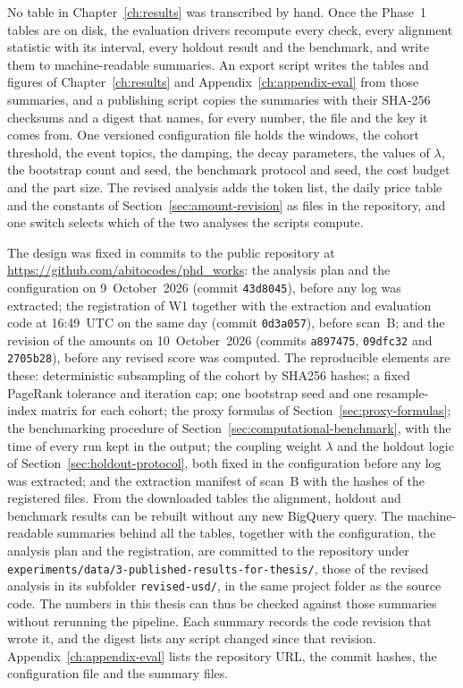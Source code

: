 
No table in Chapter~\ref{ch:results} was transcribed by hand. Once the Phase~1 tables are on disk, the evaluation drivers recompute every check, every alignment statistic with its interval, every holdout result and the benchmark, and write them to machine-readable summaries. An export script writes the tables and figures of Chapter~\ref{ch:results} and Appendix~\ref{ch:appendix-eval} from those summaries, and a publishing script copies the summaries with their SHA-256 checksums and a digest that names, for every number, the file and the key it comes from. One versioned configuration file holds the windows, the cohort threshold, the event topics, the damping, the decay parameters, the values of $\lambda$, the bootstrap count and seed, the benchmark protocol and seed, the cost budget and the part size. The revised analysis adds the token list, the daily price table and the constants of Section~\ref{sec:amount-revision} as files in the repository, and one switch selects which of the two analyses the scripts compute.

The design was fixed in commits to the public repository at \url{https://github.com/abitocodes/phd_works}: the analysis plan and the configuration on 9~October~2026 (commit \texttt{43d8045}), before any log was extracted; the registration of W1 together with the extraction and evaluation code at 16:49~UTC on the same day (commit \texttt{0d3a057}), before scan~B; and the revision of the amounts on 10~October~2026 (commits \texttt{a897475}, \texttt{09dfc32} and \texttt{2705b28}), before any revised score was computed. The reproducible elements are these: deterministic subsampling of the cohort by SHA256 hashes; a fixed PageRank tolerance and iteration cap; one bootstrap seed and one resample-index matrix for each cohort; the proxy formulas of Section~\ref{sec:proxy-formulas}; the benchmarking procedure of Section~\ref{sec:computational-benchmark}, with the time of every run kept in the output; the coupling weight $\lambda$ and the holdout logic of Section~\ref{sec:holdout-protocol}, both fixed in the configuration before any log was extracted; and the extraction manifest of scan~B with the hashes of the registered files. From the downloaded tables the alignment, holdout and benchmark results can be rebuilt without any new BigQuery query. The machine-readable summaries behind all the tables, together with the configuration, the analysis plan and the registration, are committed to the repository under \texttt{experiments/data/3-published-results-for-thesis/}, those of the revised analysis in its subfolder \texttt{revised-usd/}, in the same project folder as the source code. The numbers in this thesis can thus be checked against those summaries without rerunning the pipeline. Each summary records the code revision that wrote it, and the digest lists any script changed since that revision. Appendix~\ref{ch:appendix-eval} lists the repository URL, the commit hashes, the configuration file and the summary files.

